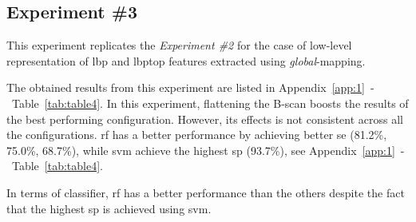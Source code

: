 \subsection{Experiment \#3}\label{subsec:exp3}
This experiment replicates the \emph{Experiment \#2} for the case of low-level representation of \ac{lbp} and \ac{lbptop} features extracted using \emph{global}-mapping.

The obtained results from this experiment are listed in Appendix~\ref{app:1}~-~Table~\ref{tab:table4}.
In this experiment, flattening the B-scan boosts the results of the best performing configuration.
However, its effects is not consistent across all the configurations.
\ac{rf} has a better performance by achieving better \ac{se} (81.2\%, 75.0\%, 68.7\%), while \ac{svm} achieve the highest \ac{sp} (93.7\%), see Appendix~\ref{app:1}~-~Table~\ref{tab:table4}.

In terms of classifier, \ac{rf} has a better performance than the others despite the fact that the highest \ac{sp} is achieved using \ac{svm}.
